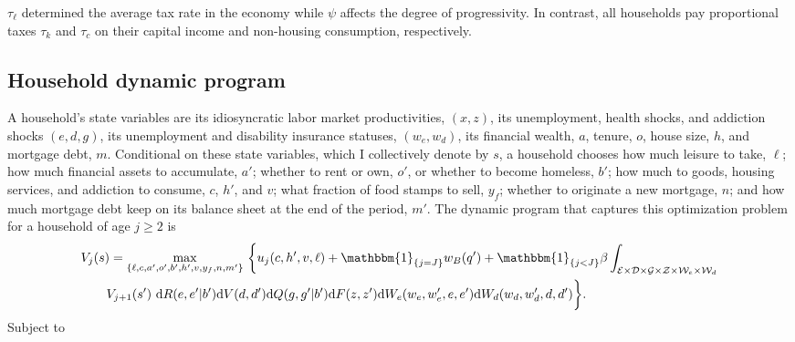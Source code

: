 \documentclass[parskip=full]{article}
\newcommand{\indicator}[1]{\mathbbm{1}_{\left\{ {#1} \right\} }}
\begin{document}
\noindent $\tau_{\ell}$ determined the average tax rate in the economy while $\psi$ affects the degree of progressivity. In contrast, all households pay proportional taxes $\tau_{k}$ and $\tau_{c}$ on their capital income and non-housing consumption, respectively.

\subsection{Household dynamic program}
A household's state variables are its idiosyncratic labor market productivities, $(x,z)$, its unemployment, health shocks, and addiction shocks $(e,d,g)$, its unemployment and disability insurance statuses, $(w_{e},w_{d})$, its financial wealth, $a$, tenure, $o$, house size, $h$, and mortgage debt, $m$. Conditional on these state variables, which I collectively denote by $s$, a household chooses how much leisure to take, $\ell$; how much financial assets to accumulate, $a'$; whether to rent or own, $o'$, or whether to become homeless, $b'$; how much to goods, housing services, and addiction to consume, $c$, $h'$, and $v$; what fraction of food stamps to sell, $y_{f}$; whether to originate a new mortgage, $n$; and how much mortgage debt keep on its balance sheet at the end of the period, $m'$. The dynamic program that captures this optimization problem for a household of age $j\geq 2$ is
\begin{align}
  & V_{j}(s)=\max_{\{\ell,c,a',o',b',h',v,y_{f},n,m'\}}\ \biggr\{u_{j}(c,h',v,\ell) +\indicator{j=J}w_B(q') + \indicator{j<J}\beta \int_{\mathcal{E} \times \mathcal{D}\times \mathcal{G}\times \mathcal{Z}\times\mathcal{W}_{e}\times\mathcal{W}_{d}} \label{eq:vf}\\ &\qquad V_{j+1}(s')\ \mathrm{d}R(e,e'|b')\mathrm{d}V(d,d')\mathrm{d}Q(g,g'|b')\mathrm{d}F(z,z')\mathrm{d}W_{e}(w_{e},w_{e}',e,e')\mathrm{d}W_{d}(w_{d},w_{d}',d,d')\biggr\}. \notag
\end{align}
Subject to
\end{document}

